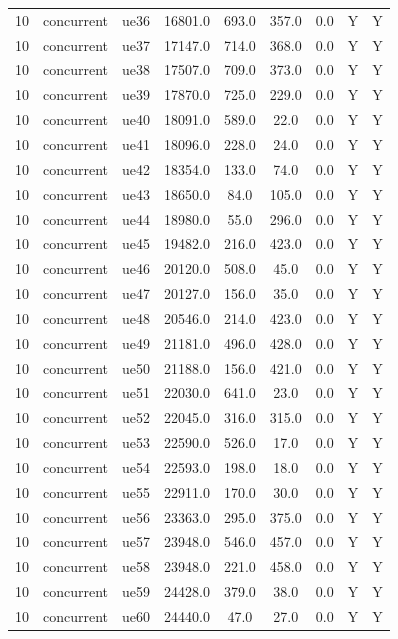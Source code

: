 \begin{table}[ht]
\begin{tabular}{|c|c|c|c|c|c|c|c|c|}
10 & concurrent & ue36 & 16801.0 & 693.0 & 357.0 & 0.0 & Y & Y \\
10 & concurrent & ue37 & 17147.0 & 714.0 & 368.0 & 0.0 & Y & Y \\
10 & concurrent & ue38 & 17507.0 & 709.0 & 373.0 & 0.0 & Y & Y \\
10 & concurrent & ue39 & 17870.0 & 725.0 & 229.0 & 0.0 & Y & Y \\
10 & concurrent & ue40 & 18091.0 & 589.0 & 22.0 & 0.0 & Y & Y \\
10 & concurrent & ue41 & 18096.0 & 228.0 & 24.0 & 0.0 & Y & Y \\
10 & concurrent & ue42 & 18354.0 & 133.0 & 74.0 & 0.0 & Y & Y \\
10 & concurrent & ue43 & 18650.0 & 84.0 & 105.0 & 0.0 & Y & Y \\
10 & concurrent & ue44 & 18980.0 & 55.0 & 296.0 & 0.0 & Y & Y \\
10 & concurrent & ue45 & 19482.0 & 216.0 & 423.0 & 0.0 & Y & Y \\
10 & concurrent & ue46 & 20120.0 & 508.0 & 45.0 & 0.0 & Y & Y \\
10 & concurrent & ue47 & 20127.0 & 156.0 & 35.0 & 0.0 & Y & Y \\
10 & concurrent & ue48 & 20546.0 & 214.0 & 423.0 & 0.0 & Y & Y \\
10 & concurrent & ue49 & 21181.0 & 496.0 & 428.0 & 0.0 & Y & Y \\
10 & concurrent & ue50 & 21188.0 & 156.0 & 421.0 & 0.0 & Y & Y \\
10 & concurrent & ue51 & 22030.0 & 641.0 & 23.0 & 0.0 & Y & Y \\
10 & concurrent & ue52 & 22045.0 & 316.0 & 315.0 & 0.0 & Y & Y \\
10 & concurrent & ue53 & 22590.0 & 526.0 & 17.0 & 0.0 & Y & Y \\
10 & concurrent & ue54 & 22593.0 & 198.0 & 18.0 & 0.0 & Y & Y \\
10 & concurrent & ue55 & 22911.0 & 170.0 & 30.0 & 0.0 & Y & Y \\
10 & concurrent & ue56 & 23363.0 & 295.0 & 375.0 & 0.0 & Y & Y \\
10 & concurrent & ue57 & 23948.0 & 546.0 & 457.0 & 0.0 & Y & Y \\
10 & concurrent & ue58 & 23948.0 & 221.0 & 458.0 & 0.0 & Y & Y \\
10 & concurrent & ue59 & 24428.0 & 379.0 & 38.0 & 0.0 & Y & Y \\
10 & concurrent & ue60 & 24440.0 & 47.0 & 27.0 & 0.0 & Y & Y \\

\end{tabular}
\end{table}
